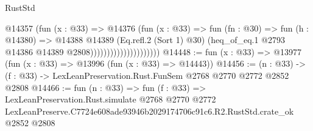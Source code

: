 \begin{lexlean}{RustStd}
\begin{coremodule}
                                      @14357
                                        (fun (x : @33) =>
                                        @14376
                                          (fun (x : @33) =>
                                          fun (fn : @30) =>
                                          fun (h : @14380) =>
                                          @14388
                                            @14389
                                            (Eq.refl.{2} (Sort 1) @30)
                                            (heq_of_eq.{1}
                                              @2793
                                              @14386
                                              @14389
                                              @2808)))))))))))))))))))))
@14448 := fun (x : @33) => @13977 (fun (x : @33) => @13996 (fun (x : @33) => @14443))
@14456 := (n : @33) -> (f : @33) -> LexLeanPreservation.Rust.FunSem @2768 @2770 @2772 @2852 @2808
@14466 := fun (n : @33) =>
  fun (f : @33) =>
  LexLeanPreservation.Rust.simulate
    @2768
    @2770
    @2772
    LexLeanPreserve.C7724e608ade93946b2029174706c91c6.R2.RustStd.crate_ok
    @2852
    @2808
\end{coremodule}
\end{lexlean}
